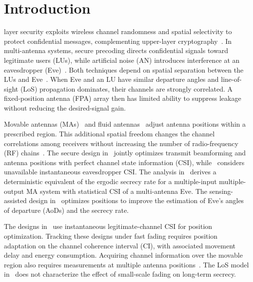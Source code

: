 \documentclass[journal]{IEEEtran}
\begin{document}
\IEEEpeerreviewmaketitle

\section{Introduction}\label{sec:intro}
 layer security exploits wireless channel randomness and spatial selectivity to protect confidential messages, complementing upper-layer cryptography~\cite{Wyner1975,Mukherjee2014,WuJSAC2018}. In multi-antenna systems, secure precoding directs confidential signals toward legitimate users (LUs), while artificial noise (AN) introduces interference at an eavesdropper (Eve)~\cite{Goel2008,Zhou2010}. Both techniques depend on spatial separation between the LUs and Eve~\cite{Mukherjee2014}. When Eve and an LU have similar departure angles and line-of-sight (LoS) propagation dominates, their channels are strongly correlated. A fixed-position antenna (FPA) array then has limited ability to suppress leakage without reducing the desired-signal gain.

Movable antennas (MAs)~\cite{ZhuMag2024,ZhuTWC2024Model} and fluid antennas~\cite{WongTWC2021} adjust antenna positions within a prescribed region. This additional spatial freedom changes the channel correlations among receivers without increasing the number of radio-frequency (RF) chains~\cite{MaTWC2024,ZhuTWC2024MU,ZhuCL2023}. The secure design in~\cite{HuSPL2024} jointly optimizes transmit beamforming and antenna positions with perfect channel state information (CSI), while~\cite{HuTMC2024} considers unavailable instantaneous eavesdropper CSI. The analysis in~\cite{XieArxiv2026} derives a deterministic equivalent of the ergodic secrecy rate for a multiple-input multiple-output MA system with statistical CSI of a multi-antenna Eve. The sensing-assisted design in~\cite{ChenArxiv2026} optimizes positions to improve the estimation of Eve's angles of departure (AoDs) and the secrecy rate.

The designs in~\cite{HuSPL2024,HuTMC2024,XieArxiv2026} use instantaneous legitimate-channel CSI for position optimization. Tracking these designs under fast fading requires position adaptation on the channel coherence interval (CI), with associated movement delay and energy consumption. Acquiring channel information over the movable region also requires measurements at multiple antenna positions~\cite{ZhengTCOM2025,HuTVT2025}. The LoS model in~\cite{ChenArxiv2026} does not characterize the effect of small-scale fading on long-term secrecy.
\end{document}
